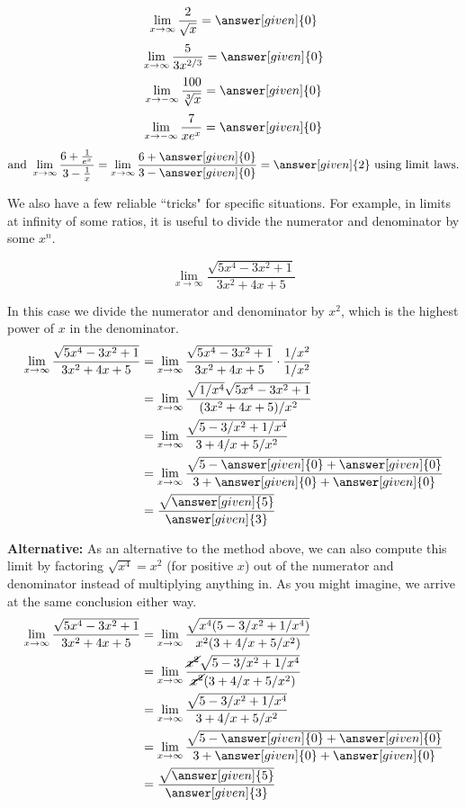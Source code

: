 \documentclass{ximera}
\begin{document}
\begin{example} $$\displaystyle\lim_{x\rightarrow\infty}\frac{2}{\sqrt{x}}=\answer[given]{0}$$
 $$\displaystyle\lim_{x\rightarrow\infty}\frac{5}{3x^{2/3}}=\answer[given]{0}$$
 $$\displaystyle\lim_{x\rightarrow -\infty}\frac{100}{\sqrt[3]{x}}=\answer[given]{0}$$
 $$\displaystyle\lim_{x\rightarrow -\infty}\frac{7}{xe^x}=\answer[given]{0}$$
  $$\mbox{and }\displaystyle\lim_{x\rightarrow \infty}\frac{6+\frac{1}{e^x}}{3-\frac{1}{x}}=\lim_{x\rightarrow \infty}\frac{6+\answer[given]{0}}{3-\answer[given]{0}}=\answer[given]{2}\mbox{  using limit laws.}$$
\end{example}

We also have a few reliable ``tricks" for specific situations. For example, in limits at infinity of some ratios, it is useful to divide the numerator and denominator by some $x^n$.

\begin{example}
$$\displaystyle\lim_{x\rightarrow \infty}\frac{\sqrt{5x^4-3x^2+1}}{3x^2+4x+5}$$

In this case we divide the numerator and denominator by $x^2$, which is the highest power of $x$ in the denominator.
\begin{align*}
\displaystyle\lim_{x\rightarrow \infty}\frac{\sqrt{5x^4-3x^2+1}}{3x^2+4x+5}&=\lim_{x\rightarrow \infty}\frac{\sqrt{5x^4-3x^2+1}}{3x^2+4x+5}\cdot\frac{1/x^2}{1/x^2}\\
&=\lim_{x\rightarrow \infty}\frac{\sqrt{1/x^4}\sqrt{5x^4-3x^2+1}}{(3x^2+4x+5)/x^2}\\
&=\lim_{x\rightarrow \infty}\frac{\sqrt{5-3/x^2+1/x^4}}{3+4/x+5/x^2}\\
&=\lim_{x\rightarrow \infty}\frac{\sqrt{5-\answer[given]{0}+\answer[given]{0}}}{3+\answer[given]{0}+\answer[given]{0}}\\
&=\frac{\sqrt{\answer[given]{5}}}{\answer[given]{3}}\end{align*}
\vspace{.2in}

\textbf{Alternative:} As an alternative to the method above, we can also compute this limit by factoring $\sqrt{x^4}=x^2$ (for positive $x$) out of the numerator and denominator instead of multiplying anything in. As you might imagine, we arrive at the same conclusion either way.
\begin{align*}
\displaystyle\lim_{x\rightarrow \infty}\frac{\sqrt{5x^4-3x^2+1}}{3x^2+4x+5}&=\lim_{x\rightarrow \infty}\frac{\sqrt{x^4(5-3/x^2+1/x^4)}}{x^2(3+4/x+5/x^2)}\\
&=\lim_{x\rightarrow \infty}\frac{\cancel{x^2}\sqrt{5-3/x^2+1/x^4}}{\cancel{x^2}(3+4/x+5/x^2)}\\
&=\lim_{x\rightarrow \infty}\frac{\sqrt{5-3/x^2+1/x^4}}{3+4/x+5/x^2}\\
&=\lim_{x\rightarrow \infty}\frac{\sqrt{5-\answer[given]{0}+\answer[given]{0}}}{3+\answer[given]{0}+\answer[given]{0}}\\
&=\frac{\sqrt{\answer[given]{5}}}{\answer[given]{3}}\end{align*}
\end{example}
\end{document}
